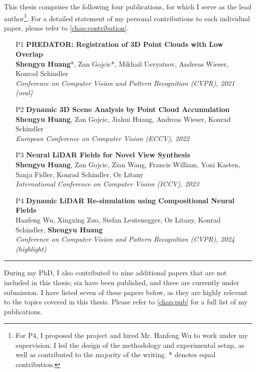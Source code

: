 This thesis comprises the following four publications, for which I serve as the lead author\footnote{For P4, I proposed the project and hired Mr. Hanfeng Wu to work under my supervision. I led the design of the methodology and experimental setup, as well as contributed to the majority of the writing. * denotes equal contribution.}. For a detailed statement of my personal contributions to each individual paper, please refer to \cref{chap:contribution}. 
\begin{itemize}
    \item [P1] \noindent\textbf{ PREDATOR: Registration of 3D Point Clouds with Low Overlap} \\[0.5em]
    \textbf{Shengyu Huang}*, Zan Gojcic*, Mikhail Usvyatsov, Andreas Wieser, Konrad Schindler \\
    \textit{Conference on Computer Vision and Pattern Recognition (CVPR), 2021 (oral)}
    
    \item [P2] \noindent\textbf{ Dynamic 3D Scene Analysis by Point Cloud Accumulation} \\[0.5em]
    \textbf{Shengyu Huang}, Zan Gojcic, Jiahui Huang, Andreas Wieser, Konrad Schindler \\
    \textit{European Conference on Computer Vision (ECCV), 2022}
    
    \item [P3] \noindent\textbf{ Neural LiDAR Fields for Novel View Synthesis} \\[0.5em]
    \textbf{Shengyu Huang}, Zan Gojcic, Zian Wang, Francis William, Yoni Kasten, Sanja Fidler, Konrad Schindler, Or Litany \\
    \textit{International Conference on Computer Vision (ICCV), 2023}
    
    \item [P4] \noindent\textbf{ Dynamic LiDAR Re-simulation using Compositional Neural Fields} \\[0.5em]
    Hanfeng Wu, Xingxing Zuo, Stefan Leutenegger, Or Litany, Konrad Schindler, \textbf{Shengyu Huang} \\
    \textit{Conference on Computer Vision and Pattern Recognition (CVPR), 2024 (highlight)}
\end{itemize}

\vspace{1em}
\hrule
\vspace{1em}

\noindent
During my PhD, I also contributed to nine additional papers that are not included in this thesis; six have been published, and three are currently under submission. I have listed seven of these papers below, as they are highly relevant to the topics covered in this thesis. Please refer to \cref{chap:pub} for a full list of my publications.

